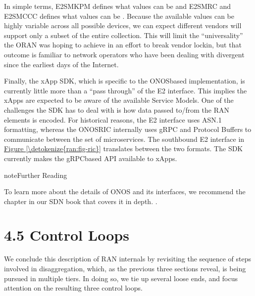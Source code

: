 \documentclass[a4paper,11pt,english]{sphinxmanual}
\begin{document}
\sphinxAtStartPar
In simple terms, E2SM\sphinxhyphen{}KPM defines what values can be  and
E2SM\sphinxhyphen{}RC and E2SM\sphinxhyphen{}CCC defines what values can be . Because
the available values can be highly variable across all possible
devices, we can expect different vendors will support only a subset
of the entire collection. This will limit the “universality” the
O\sphinxhyphen{}RAN was hoping to achieve in an effort to break vendor lock\sphinxhyphen{}in,
but that outcome is familiar to network operators who have been
dealing with divergent  since
the earliest days of the Internet.

\sphinxAtStartPar
Finally, the xApp SDK, which is specific to the ONOS\sphinxhyphen{}based
implementation, is currently little more than a “pass through” of the
E2 interface. This implies the xApps are expected to be aware of the
available Service Models. One of the challenges the SDK has to deal
with is how data passed to/from the RAN elements is encoded. For
historical reasons, the E2 interface uses ASN.1 formatting, whereas
the ONOS\sphinxhyphen{}RIC internally uses gRPC and Protocol Buffers to communicate
between the set of microservices. The south\sphinxhyphen{}bound E2 interface in
\hyperref[\detokenize{ran:fig-ric}]{Figure \ref{\detokenize{ran:fig-ric}}} translates between the two formats. The
SDK currently makes the gRPC\sphinxhyphen{}based API available to xApps.

\label{\detokenize{ran:reading-onos}}
\begin{sphinxadmonition}{note}{Further Reading}

\sphinxAtStartPar
To learn more about the details of ONOS and its interfaces, we
recommend the chapter in our SDN book that covers it in
depth. .
\end{sphinxadmonition}


\section{4.5 Control Loops}
\label{\detokenize{ran:control-loops}}
\sphinxAtStartPar
We conclude this description of RAN internals by revisiting the
sequence of steps involved in disaggregation, which, as the previous
three sections reveal, is being pursued in multiple tiers. In doing
so, we tie up several loose ends, and focus attention on the resulting
three control loops.
\end{document}
